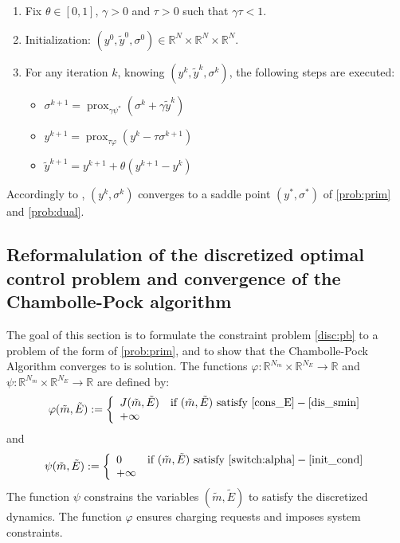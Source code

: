 \documentclass[conference]{IEEEtran}
\DeclareMathOperator{\prox}{prox}
\begin{document}
\begin{enumerate}
\item Fix $\theta\in[0,1]$, $\gamma>0$ and $\tau>0$ such that $\gamma \tau <1$.
\item Initialization: $(y^0,\tilde{y}^0,\sigma^0)\in\mathbb{R}^N\times \mathbb{R}^N\times \mathbb{R}^N$.
\item For any iteration $k$, knowing  $(y^k,\tilde{y}^k,\sigma^k)$, the following steps are executed:
    \begin{itemize}
    \item $\sigma^{k+1}=\prox_{\gamma\psi^\ast}(\sigma^k+\gamma \tilde{y}^k)$
    \item $ y^{k+1} = \prox_{\tau\varphi}(y^k-\tau\sigma^{k+1})$
    \item $ \tilde{y}^{k+1} =  y^{k+1} +\theta (y^{k+1}-y^k)$
    \end{itemize}
\end{enumerate}
Accordingly to \cite[Theorem 1]{chambolle2011first}, $(y^k,\sigma^k)$ converges to a saddle point $(y^\ast, \sigma^\ast)$ of \eqref{prob:prim} and \eqref{prob:dual}.

\subsection{Reformalulation of the discretized optimal control problem and convergence of the Chambolle-Pock algorithm}

The goal of this section is to formulate the constraint problem \eqref{disc:pb} to a problem of the form of \eqref{prob:prim}, and to show that the  Chambolle-Pock Algorithm converges to is solution. 
The functions $\varphi:\mathbb{R}^{N_m}\times \mathbb{R}^{N_E} \to \mathbb{R}$ and $\psi:\mathbb{R}^{N_m}\times \mathbb{R}^{N_E} \to \mathbb{R}$ are defined by:
\begin{equation*}
\label{def_varphi}
 \varphi(\tilde{m},\tilde{E}):=
 \left\{
 \begin{array}{ll}
 J(\tilde{m},\tilde{E}) & \mbox{if }(\tilde{m},\tilde{E})\mbox{ satisfy }\eqref{cons_E}-\eqref{dis_smin}\\
 +\infty & 
 \end{array}
 \right.
\end{equation*}
and
\begin{equation*}
\label{def_psi}
 \psi(\tilde{m},\tilde{E}):=
 \left\{
 \begin{array}{ll}
 0 & \mbox{if }(\tilde{m},\tilde{E})\mbox{ satisfy }\eqref{switch:alpha}-\eqref{init_cond}\\
 +\infty & 
 \end{array}
 \right.
\end{equation*}
The function $\psi$ constrains the variables $(\tilde{m},\tilde{E})$ to satisfy the discretized dynamics. The function $\varphi$ ensures charging requests and imposes system constraints.
\end{document}
